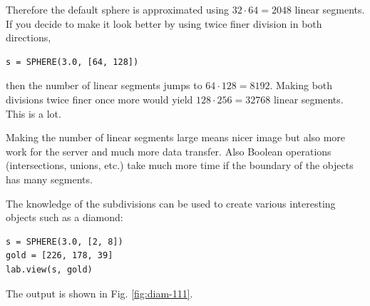 \noindent
Therefore the default sphere is approximated using $32\cdot 64 = 2048$ linear
segments. If you decide to make it look better by using 
twice finer division in both directions,\\

\begin{bbox}
\begin{verbatim}
s = SPHERE(3.0, [64, 128])
\end{verbatim}
\end{bbox}
\vspace{6mm}

\noindent
then the number of linear segments jumps to $64\cdot 128 = 8192$. Making 
both divisions twice finer once more would yield $128 \cdot 256 = 32768$ linear
segments. This is a lot.\\

\begin{gbox}
\begin{center}
Making the number of linear segments large means nicer image but also 
more work for the server and much more data transfer. Also Boolean 
operations (intersections, unions, etc.) take much more
time if the boundary of the objects has many segments.
\end{center}
\end{gbox}
\vspace{6mm}

\noindent
The knowledge of the subdivisions can be used to create 
various interesting objects such as a diamond:\\

\begin{bbox}
\begin{verbatim}
s = SPHERE(3.0, [2, 8])
gold = [226, 178, 39]
lab.view(s, gold)
\end{verbatim}
\end{bbox}
\vspace{6mm}

\noindent
The output is shown in Fig. \ref{fig:diam-111}.

